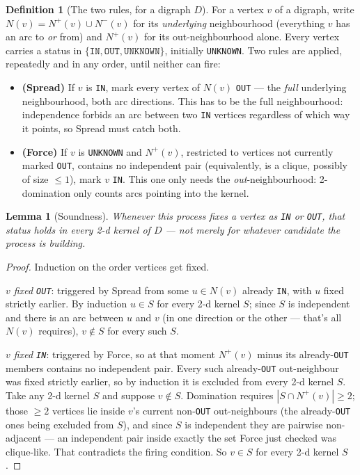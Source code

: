 \documentclass[11pt]{article}
\theoremstyle{plain}
\newtheorem{lemma}[theorem]{Lemma}
\theoremstyle{definition}
\newtheorem{definition}[theorem]{Definition}
\begin{document}
\pagestyle{empty}

\begin{definition}[The two rules, for a digraph $D$]
\label{def:rules}
For a vertex $v$ of a digraph, write $N(v) = N^+(v) \cup N^-(v)$ for its
\emph{underlying} neighbourhood (everything $v$ has an arc to \emph{or} from) and
$N^+(v)$ for its out-neighbourhood alone. Every vertex carries a status in
$\{\texttt{IN}, \texttt{OUT}, \texttt{UNKNOWN}\}$, initially \texttt{UNKNOWN}. Two
rules are applied, repeatedly and in any order, until neither can fire:
\begin{itemize}[nosep]
\item \textbf{(Spread)} If $v$ is \texttt{IN}, mark every vertex of $N(v)$
\texttt{OUT} — the \emph{full} underlying neighbourhood, both arc directions. This
has to be the full neighbourhood: independence forbids an arc between two
\texttt{IN} vertices regardless of which way it points, so Spread must catch both.
\item \textbf{(Force)} If $v$ is \texttt{UNKNOWN} and $N^+(v)$, restricted to
vertices not currently marked \texttt{OUT}, contains no independent pair
(equivalently, is a clique, possibly of size $\le1$), mark $v$ \texttt{IN}. This one
only needs the \emph{out}-neighbourhood: 2-domination only counts arcs pointing
into the kernel.
\end{itemize}
\end{definition}

\begin{lemma}[Soundness]
\label{lem:sound}
Whenever this process fixes a vertex as \texttt{IN} or \texttt{OUT}, that status
holds in every 2-d kernel of $D$ — not merely for whatever candidate the process is
building.
\end{lemma}

\begin{proof}
Induction on the order vertices get fixed.

\emph{$v$ fixed \texttt{OUT}}: triggered by Spread from some $u \in N(v)$ already
\texttt{IN}, with $u$ fixed strictly earlier. By induction $u \in S$ for every
2-d kernel $S$; since $S$ is independent and there is an arc between $u$ and $v$ (in
one direction or the other — that's all $N(v)$ requires), $v \notin S$ for every
such $S$.

\emph{$v$ fixed \texttt{IN}}: triggered by Force, so at that moment $N^+(v)$ minus
its already-\texttt{OUT} members contains no independent pair. Every such
already-\texttt{OUT} out-neighbour was fixed strictly earlier, so by induction it is
excluded from every 2-d kernel $S$. Take any 2-d kernel $S$ and suppose $v \notin S$.
Domination requires $|S \cap N^+(v)| \ge 2$; those $\ge 2$ vertices lie inside $v$'s
current non-\texttt{OUT} out-neighbours (the already-\texttt{OUT} ones being
excluded from $S$), and since $S$ is independent they are pairwise non-adjacent —
an independent pair inside exactly the set Force just checked was clique-like. That
contradicts the firing condition. So $v \in S$ for every 2-d kernel $S$.
\end{proof}
\end{document}
